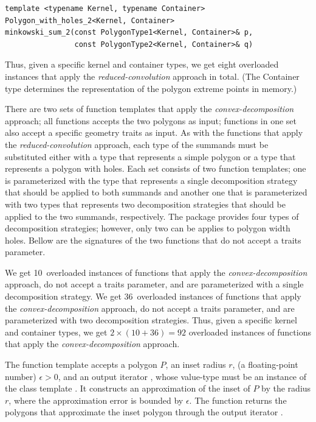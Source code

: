 \begin{lstfloat}
\begin{lstlisting}[style=cppFramedStyle,basicstyle=\scriptsize,label={lst:cpp:minkSum},caption={The signature of one of the \cppLstinline{CGAL::minkowski_sum_2} overloaded function templates.}]
template <typename Kernel, typename Container>
Polygon_with_holes_2<Kernel, Container>
minkowski_sum_2(const PolygonType1<Kernel, Container>& p,
                const PolygonType2<Kernel, Container>& q)
\end{lstlisting}
\end{lstfloat}

Thus, given a specific kernel and container types, we get eight overloaded instances that apply the \emph{reduced-convolution} approach in total. (The Container type determines the representation of the polygon extreme points in memory.)

There are two sets of function templates  that apply the \emph{convex-decomposition} approach; all functions accepts the two polygons as input; functions in one set also accept a specific geometry traits as input. As with the functions that apply the \emph{reduced-convolution} approach, each type of the summands must be substituted either with a type that represents a simple polygon or a type that represents a polygon with holes. Each set consists of two function templates; one is parameterized with the type that represents a single decomposition strategy that should be applied to both summands and another one that is parameterized with two types that represents two decomposition strategies that should be applied to the two summands, respectively. The package provides four types of decomposition strategies; however, only two can be applies to polygon width holes. Bellow are the signatures of the two functions that do not accept a traits parameter.

We get 10~overloaded instances of functions that apply the \emph{convex-decomposition} approach, do not accept a traits parameter, and are parameterized with a single decomposition strategy. We get 36~overloaded instances of functions that apply the \emph{convex-decomposition} approach, do not accept a traits parameter, and are parameterized with two decomposition strategies. Thus, given a specific kernel and container types, we get $2 \times (10 + 36) = 92$ overloaded instances of functions that apply the \emph{convex-decomposition} approach.

The  function template accepts a polygon $P$, an inset radius $r$, (a floating-point number) $\epsilon > 0$, and an output iterator , whose value-type must be an instance of the class template . It constructs an approximation of the inset of $P$ by the radius $r$, where the approximation error is bounded by $\epsilon$. The function returns the polygons that approximate the inset polygon through the output iterator .

